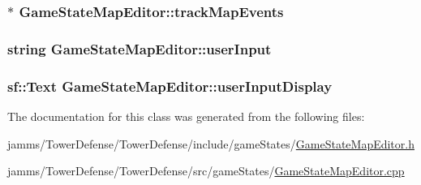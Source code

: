 \hypertarget{class_game_state_map_editor_a8a2f5da5eb2539b7ecb05298fda98ba1}{
\subsubsection[{track\+Map\+Events}]{$\ast$ Game\+State\+Map\+Editor\+::track\+Map\+Events}}\label{class_game_state_map_editor_a8a2f5da5eb2539b7ecb05298fda98ba1}
\hypertarget{class_game_state_map_editor_aa3fc0514a4faa043d6789fd830d2c5ef}{
\subsubsection[{user\+Input}]{\setlength{\rightskip}{0pt plus 5cm}string Game\+State\+Map\+Editor\+::user\+Input\hspace{0.3cm}{\ttfamily [private]}}}\label{class_game_state_map_editor_aa3fc0514a4faa043d6789fd830d2c5ef}
\hypertarget{class_game_state_map_editor_aa28847e54111b5131e3825fc6e6c32b2}{
\subsubsection[{user\+Input\+Display}]{\setlength{\rightskip}{0pt plus 5cm}sf\+::\+Text Game\+State\+Map\+Editor\+::user\+Input\+Display\hspace{0.3cm}{\ttfamily [private]}}}\label{class_game_state_map_editor_aa28847e54111b5131e3825fc6e6c32b2}


The documentation for this class was generated from the following files\+:\begin{DoxyCompactItemize}
\item 
jamms/\+Tower\+Defense/\+Tower\+Defense/include/game\+States/\hyperlink{_game_state_map_editor_8h}{Game\+State\+Map\+Editor.\+h}\item 
jamms/\+Tower\+Defense/\+Tower\+Defense/src/game\+States/\hyperlink{_game_state_map_editor_8cpp}{Game\+State\+Map\+Editor.\+cpp}\end{DoxyCompactItemize}
